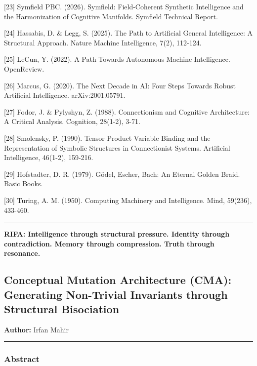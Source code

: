 \documentclass[
  11pt,
  a4paper,
]{article}
\begin{document}
{[}23{]} Symfield PBC. (2026). Symfield: Field-Coherent Synthetic
Intelligence and the Harmonization of Cognitive Manifolds. Symfield
Technical Report.

{[}24{]} Hassabis, D. \& Legg, S. (2025). The Path to Artificial General
Intelligence: A Structural Approach. Nature Machine Intelligence, 7(2),
112-124.

{[}25{]} LeCun, Y. (2022). A Path Towards Autonomous Machine
Intelligence. OpenReview.

{[}26{]} Marcus, G. (2020). The Next Decade in AI: Four Steps Towards
Robust Artificial Intelligence. arXiv:2001.05791.

{[}27{]} Fodor, J. \& Pylyshyn, Z. (1988). Connectionism and Cognitive
Architecture: A Critical Analysis. Cognition, 28(1-2), 3-71.

{[}28{]} Smolensky, P. (1990). Tensor Product Variable Binding and the
Representation of Symbolic Structures in Connectionist Systems.
Artificial Intelligence, 46(1-2), 159-216.

{[}29{]} Hofstadter, D. R. (1979). Gödel, Escher, Bach: An Eternal
Golden Braid. Basic Books.

{[}30{]} Turing, A. M. (1950). Computing Machinery and Intelligence.
Mind, 59(236), 433-460.

\begin{center}\rule{0.5\linewidth}{0.5pt}\end{center}

\textbf{RIFA: Intelligence through structural pressure. Identity through
contradiction. Memory through compression. Truth through resonance.}

\newpage

\subsection{Conceptual Mutation Architecture (CMA): Generating
Non-Trivial Invariants through Structural
Bisociation}\label{conceptual-mutation-architecture-cma-generating-non-trivial-invariants-through-structural-bisociation}

\textbf{Author:} Irfan Mahir

\begin{center}\rule{0.5\linewidth}{0.5pt}\end{center}

\subsubsection{Abstract}\label{abstract-3}
\end{document}
